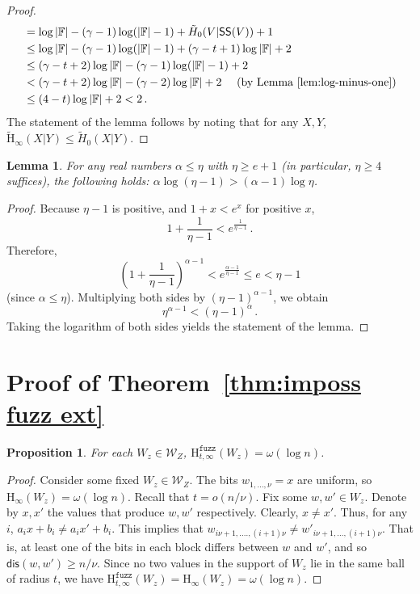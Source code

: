 \documentclass[11pt]{article}
\newtheorem{lemma}[theorem]{Lemma}
\newtheorem{proposition}[theorem]{Proposition}
\newcommand{\thref}[1]{\mbox{Theorem~\ref{#1}}}
\newcommand{\lemref}[1]{\mbox{Lemma~\ref{#1}}}
\newcommand{\class}[1]{{\ensuremath{\mathsf{#1}}}}
\newcommand{\sketch}{\ensuremath{\class{SS}}\xspace}
\newcommand{\dis}{\ensuremath{\mathsf{dis}}}
\newcommand{\Hoo}{\mathrm{H}_\infty}
\newcommand{\Hav}{\tilde{\mathrm{H}}_\infty}
\newcommand{\Hfuzz}{\mathrm{H}^{\mathtt{fuzz}}_{t,\infty}}
\begin{document}
\begin{proof}
\begin{align*}
&=\log |\mathbb{F}| - (\gamma -1)\log (|\mathbb{F}|-1) + \tilde{H}_0(V | \sketch(V)) +1 \\ 
&\le \log |\mathbb{F}| - (\gamma -1)\log (|\mathbb{F}|-1) + (\gamma-t+1)\log |\mathbb{F}|+2\\
&\le (\gamma-t+2)\log |\mathbb{F}| - (\gamma-1) \log (|\mathbb{F}|-1)+2\\
&< (\gamma-t+2)\log |\mathbb{F}| - (\gamma-2) \log |\mathbb{F}| +2 \ \ \ \ \mbox{(by \lemref{lem:log-minus-one})}\\
&\le (4-t)\log |\mathbb{F}| +2< 2\,.
\end{align*}
The statement of the lemma follows by noting that for any $X, Y$, $\Hav(X|Y)\le \tilde{H}_0(X|Y)$.
\end{proof}

\begin{lemma}
\label{lem:log-minus-one}
For any real numbers $\alpha \leq \eta$ with $\eta \ge e+1$ (in particular, $\eta\ge 4$ suffices), the following holds:
$\alpha \log (\eta-1) > (\alpha-1)\log \eta$. 
\end{lemma}

\begin{proof}
Because $\eta-1$ is positive, and $1+x<e^x$ for positive $x$,
$$1+\frac{1}{\eta-1} < e^{\frac{1}{\eta -1}}\,.$$  Therefore, 
$$\left(1+\frac{1}{\eta-1}\right)^{\alpha-1} < e^{\frac{\alpha-1}{\eta-1}}\le e < \eta-1$$ (since $\alpha\le \eta$). Multiplying both sides by $(\eta-1)^{\alpha-1}$, we obtain
$$\eta^{\alpha-1} < (\eta-1)^\alpha\,.$$
Taking the logarithm of both sides yields the statement of the lemma.
\end{proof}


\section{Proof of \thref{thm:imposs fuzz ext}}
\label{sec:fuzz ext proof}
\begin{proposition} 
\label{prop:dist fuzzy ent fuzz}
For each $W_z\in\mathcal{W}_Z$, $\Hfuzz(W_z) = \omega(\log n)$.
\end{proposition}
\begin{proof}
Consider some fixed $W_z\in\mathcal{W}_Z$.  The bits $w_{1,..., \nu} =x$ are uniform, so $\Hoo(W_z) =\omega(\log n)$.  Recall that $t=o (n/\nu)$. 
Fix some $w, w'\in W_z$.  Denote by $x, x'$ the values that produce $w, w'$ respectively.  Clearly, $x\neq x'$.  Thus, for any $i$, $a_i x + b_i \neq a_i x' + b_i$.  This implies that $w_{i\nu+1,...., (i+1)\nu} \neq w'_{i\nu+1,..., (i+1)\nu}$. That is, at least one of the bits in each block differs between $w$ and $w'$, and so $\dis(w, w') \ge n/\nu$. Since no two values in the support of $W_z$ lie in the same ball of radius $t$, we have $\Hfuzz(W_z) = \Hoo(W_z)= \omega(\log n)$.
\end{proof}
\end{document}
